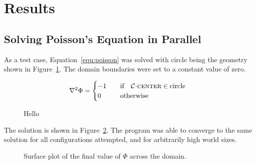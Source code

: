 \documentclass[twoside]{IIBproject}
\newcommand{\acc}{{\mkern 0.5mu\cdot\mkern 0.5mu}}
\numberwithin{figure}{section}
\begin{document}



\section{Results} %
    \label{sec:results}

    \subsection{Solving Poisson's Equation in Parallel} %
        \label{sec:results-poissons}

        As a test case, Equation~\ref{equ:poisson} was solved with circle being the geometry shown in Figure~\ref{fig:pois-geometry}. The domain boundaries were set to a constant value of zero.

        \begin{equation}
            \laplacian{\Phi}=\begin{cases}
                -1 & \qq{if} \mathcal{C}\acc\textproc{center} \in \text{circle} \\
                0 & \qq{otherwise}
            \end{cases}
            \label{equ:poisson}
        \end{equation}

        \begin{figure}[!htbp]
            \centering
            \caption{Hello}
            \label{fig:pois-geometry}
        \end{figure}

        The solution is shown in Figure~\ref{fig:pois-result}. The program was able to converge to the same solution for all configurations attempted, and for arbitrarily high world sizes. 

        \begin{figure}[!htbp]
            \centering
            
            \caption{Surface plot of the final value of $\Phi$ across the domain.}
            \label{fig:pois-result}
        \end{figure}

\end{document}
